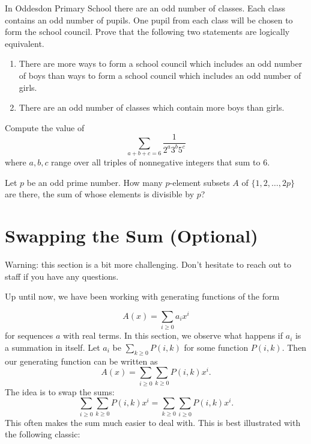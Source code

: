 \documentclass{article}
\begin{document}
\begin{prob}{9}
In Oddesdon Primary School there are an odd number of classes. Each class contains an odd number of pupils. One pupil from each class will be chosen to form the school council. Prove that the following two statements are logically equivalent.
\begin{enumerate}
\item There are more ways to form a school council which includes an odd number of boys than ways to form a school council which includes an odd number of girls.

\item There are an odd number of classes which contain more boys than girls.
\end{enumerate}
\end{prob}

\begin{prob}[NYCMT 2020]{13}
Compute the value of
\[\sum_{a+b+c=6}\frac{1}{2^a3^b5^c}\]
where $a,b,c$ range over all triples of nonnegative integers that sum to $6.$
\end{prob}

\begin{prob}[IMO 1995/6]{13}
Let $p$ be an odd prime number. How many $p$-element subsets $A$ of $\{1,2,\dots,2p\}$ are there, the sum of whose elements is divisible by $p$?
\end{prob}

\newpage

\section{Swapping the Sum (Optional)}

Warning: this section is a bit more challenging. Don't hesitate to reach out to staff if you have any questions.

\vspace{4mm}

Up until now, we have been working with generating functions of the form

\[A(x) = \sum_{i \ge 0}a_ix^i\]
for sequences $a$ with real terms. In this section, we observe what happens if $a_i$ is a summation in itself.
Let $a_i$ be $\sum_{k \ge 0} P(i, k)$ for some function $P(i, k)$. Then our generating function can be written as
\[A(x) = \sum_{i \ge 0}\sum_{k \ge 0} P(i, k)x^i.\]
The idea is to swap the sums:
\[\sum_{i \ge 0}\sum_{k \ge 0} P(i, k)x^i = \sum_{k \ge 0}\sum_{i \ge 0} P(i, k)x^i.\]
This often makes the sum much easier to deal with.
This is best illustrated with the following classic:
\end{document}
